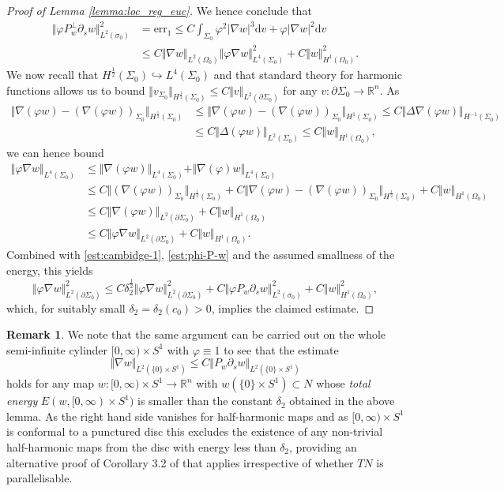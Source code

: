 \documentclass[10pt,reqno]{amsart}
\theoremstyle{plain}
\theoremstyle{definition}
\newtheorem{rmk}[lemma]{Remark}
\numberwithin{equation}{section}
\newcommand{\de}{\delta}
\newcommand{\si}{\sigma}
\newcommand{\Si}{\Sigma}
\newcommand{\vph}{\varphi}
\newcommand{\vphi}{\varphi}
\newcommand{\R}{\ensuremath{{\mathbb R}}}
\newcommand{\embed}{\hookrightarrow}
\newcommand{\norm}[1]{\Vert#1\Vert}
\newcommand{\beqa}{\begin{equation}\begin{aligned}}
\newcommand{\eeqa}{\end{aligned}\end{equation}}
\newcommand{\half}{\frac{1}{2}}
\newcommand{\dd}{\mathrm{d}} %
\newcommand{\abs}[1]{\vert#1\vert}
\newcommand{\pSi}{{\partial \Sigma}}
\newcommand{\hf}{\frac{1}{2}} %
\newcommand{\p}{\partial} %
\newcommand{\err}{\text{err}}
\begin{document}
\begin{proof}[Proof of Lemma \ref{lemma:loc_reg_euc}]
    We hence conclude that 
    \beqa \label{est:phi-P-w}      
        \norm{\vph P_w^\perp\p_s w}_{L^2(\si_0)}^2 &=\err_1 \leq C\int_{\Si_0}\vph^2 \abs{\nabla w}^3 \dd v + \vph \abs{\nabla w}^2 \dd v\\
        &\leq C\norm{\nabla w}_{L^2(\Omega_0)} \norm{\vph \nabla w}_{L^4(\Si_0)}^2+ C\norm{w}_{H^1(\Omega_0)}^2.
    \eeqa
    We now recall that $H^\hf(\Si_0) \embed L^4(\Si_0)$ and that  standard theory for harmonic functions allows us to bound $\norm{v_{\Si_0}}_{H^\hf(\Si_0)} \leq C\norm{v}_{L^2(\p \Si_0)}$ for any $v:\pSi_0\to \R^n$. As 
    \begin{align*}
        \norm{\nabla(\vph w) - (\nabla(\vph w))_{\Si_0}}_{H^\hf(\Si_0)} &\leq \norm{\nabla(\vph w) - (\nabla(\vph w))_{\Si_0}}_{H^1(\Si_0)}\leq C\norm{\Delta \nabla(\vph w) }_{H^{-1}(\Si_0)}\\
        &\leq C\norm{\Delta (\vph w)}_{L^2(\Si_0)} \leq C\norm{w}_{H^1(\Omega_0)},
    \end{align*}
    we can hence bound  
    \begin{align*}
        \norm{\vph \nabla w}_{L^4(\Si_0)} &\leq \norm{\nabla (\vph w)}_{L^4(\Si_0)} + \norm{\nabla(\vph) w}_{L^4(\Si_0)}\\
        &\leq C\norm{(\nabla(\vph w))_{\Si_0}}_{H^\hf(\Si_0)} + C\norm{\nabla(\vph w) - (\nabla(\vph w))_{\Si_0}}_{H^\hf(\Si_0)} + C\norm{w}_{H^1(\Omega_0)}\\
        &\leq C\norm{\nabla(\vph w)}_{L^2(\p \Si_0)} +C\norm{w}_{H^1(\Omega_0)}\\
        &\leq C\norm{\vph \nabla w}_{L^2(\p \Si_0)} + C\norm{w}_{H^1(\Omega_0)}.
    \end{align*}
    Combined with \eqref{est:cambidge-1}, \eqref{est:phi-P-w} and the assumed smallness of the energy, this yields 
    $$\norm{\vph \nabla w}_{L^2(\p\Si_0)}^2 \leq C\de_2^{\half} \norm{\vph \nabla w}_{L^2(\p\Si_0)}^2 + C\norm{\vph P_w\p_s w}_{L^2(\si_0)}^2+C\norm{w}_{H^1(\Omega_0)}^2,$$ 
    which, for suitably small $\de_2=\de_2(c_0)>0$, implies the claimed estimate.
\end{proof}

\begin{rmk}\label{rmk:bubble_energy_lower_bound}
    We note that the same argument can be carried out 
    on the whole semi-infinite cylinder $[0,\infty)\times S^1$ with $\vphi\equiv 1$
 to see that the estimate  
    \begin{equation*}
        \norm{\nabla w}_{L^2(\{0\}\times S^1)} \leq C\norm{P_w \p_s w}_{L^2(\{0\}\times S^1)}
    \end{equation*}
    holds for any map $w:[0,\infty)\times S^1\to \R^n$ with $w(\{0\}\times S^1)\subset N$ whose \textit{total energy} $E(w,[0,\infty)\times S^1)$ is smaller than the constant $\de_2$ obtained in the above lemma. As the right hand side vanishes for half-harmonic maps 
    and as $[0,\infty)\times S^1$ is conformal to a punctured disc this excludes the existence of any non-trivial half-harmonic maps from the disc with energy less than $\de_2$, providing an alternative proof of Corollary 3.2 of \cite{S} that applies irrespective of whether $TN$ is parallelisable. 
\end{rmk}
\end{document}
